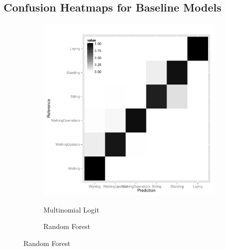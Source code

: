 \clearpage
\begin{appendices}

\section{Confusion Heatmaps for Baseline Models}

\begin{landscape}
\begin{figure}
  \centering
  \begin{subfigure}[b]{0.45\textwidth}
    \caption{Multinomial Logit}
    \includegraphics[width=\textwidth]{heatmap_dmr.pdf}
    \label{fig:heatmap_dmr}
  \end{subfigure}
  \begin{subfigure}[b]{0.45\textwidth}
    \caption{Random Forest}

\end{subfigure}
\end{figure}
\end{landscape}
\end{appendices}
